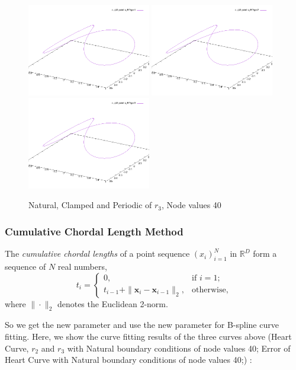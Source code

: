 \documentclass{article}
\begin{document}
\begin{figure}[H]
    \centering
    \includegraphics[width=0.48\textwidth]{../figure/B1r3spline_plot_40.png}
    \includegraphics[width=0.48\textwidth]{../figure/B2r3spline_plot_40.png}
    \includegraphics[width=0.48\textwidth]{../figure/B3r3spline_plot_40.png}
    \caption{Natural, Clamped and Periodic of \(r_3\), Node values 40}
\end{figure}

\subsubsection{Cumulative Chordal Length Method}
The \textit{cumulative chordal lengths} of a point sequence \((x_i)_{i=1}^N\) in \(\mathbb{R}^D\) form a sequence of \(N\) real numbers,
\[
t_i = 
\begin{cases} 
0, & \text{if } i = 1; \\
t_{i-1} + \|\mathbf{x}_i - \mathbf{x}_{i-1}\|_2, & \text{otherwise},
\end{cases}
\]
where \(\|\cdot\|_2\) denotes the Euclidean 2-norm.\par
So we get the new parameter and use the new parameter for B-spline curve fitting. Here, we show the curve fitting results of the three curves above (Heart Curve, \(r_2\) and \(r_3\) with Natural boundary conditions of node values 40; Error of Heart Curve with Natural boundary conditions of node values 40;) :
\end{document}
